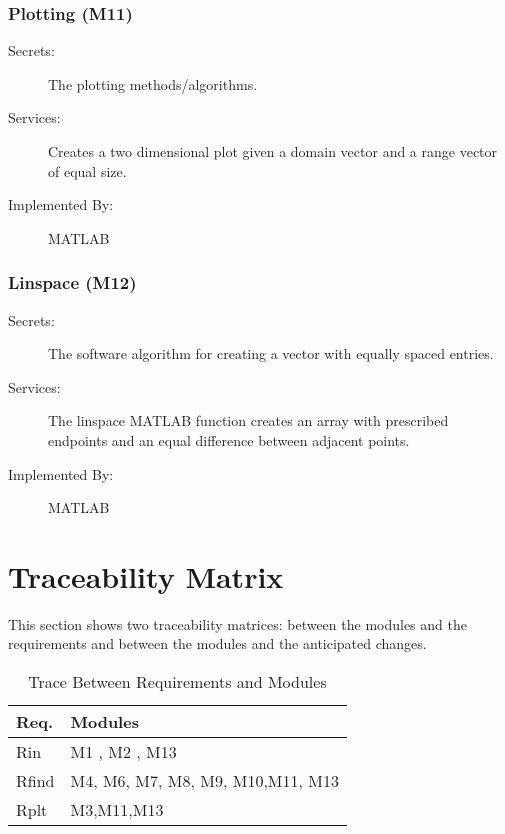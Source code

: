 \documentclass[12pt, titlepage]{article}
\begin{document}
	\subsubsection{Plotting (M11)} \label{M11}
	
	\begin{description}
		\item[Secrets:] The plotting methods/algorithms.
		\item[Services:] Creates a two dimensional plot given a domain vector 
		and a 
		range vector of equal size.  
		\item[Implemented By:] MATLAB
	\end{description} 
	
	\subsubsection{Linspace (M12)} \label{M12}
	
	\begin{description}
		\item[Secrets:] The software algorithm for creating a vector with 
		equally 
		spaced entries. 
		\item[Services:] The linspace MATLAB function creates an array with
		prescribed endpoints and an equal difference between adjacent
		points. 
		\item[Implemented By:] MATLAB
	\end{description} 
	
	\section{Traceability Matrix} \label{SecTM}
	
	This section shows two traceability matrices: between the modules and the
	requirements and between the modules and the anticipated changes.
	
	\begin{table}[H]
		\centering
		\begin{tabular}{p{} p{}}
			\toprule
			\textbf{Req.} & \textbf{Modules}\\
			\midrule
			Rin & M1 , M2 , M13\\
			Rfind & M4, M6, M7, M8, M9, M10,M11, M13\\
			Rplt & M3,M11,M13 \\
			\bottomrule
		\end{tabular}
		\caption{Trace Between Requirements and Modules}
		\label{TblRT}
	\end{table}
	
\end{document}
